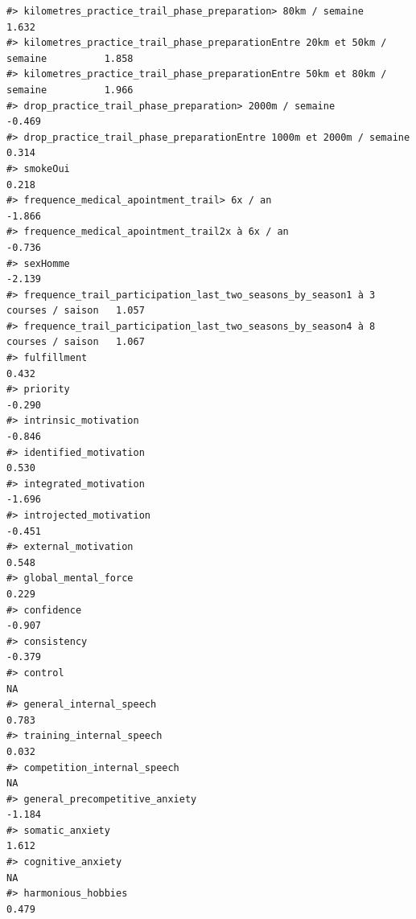 \documentclass[
]{article}
\begin{document}
\begin{verbatim}
#> kilometres_practice_trail_phase_preparation> 80km / semaine                      1.632
#> kilometres_practice_trail_phase_preparationEntre 20km et 50km / semaine          1.858
#> kilometres_practice_trail_phase_preparationEntre 50km et 80km / semaine          1.966
#> drop_practice_trail_phase_preparation> 2000m / semaine                          -0.469
#> drop_practice_trail_phase_preparationEntre 1000m et 2000m / semaine              0.314
#> smokeOui                                                                         0.218
#> frequence_medical_apointment_trail> 6x / an                                     -1.866
#> frequence_medical_apointment_trail2x à 6x / an                                  -0.736
#> sexHomme                                                                        -2.139
#> frequence_trail_participation_last_two_seasons_by_season1 à 3 courses / saison   1.057
#> frequence_trail_participation_last_two_seasons_by_season4 à 8 courses / saison   1.067
#> fulfillment                                                                      0.432
#> priority                                                                        -0.290
#> intrinsic_motivation                                                            -0.846
#> identified_motivation                                                            0.530
#> integrated_motivation                                                           -1.696
#> introjected_motivation                                                          -0.451
#> external_motivation                                                              0.548
#> global_mental_force                                                              0.229
#> confidence                                                                      -0.907
#> consistency                                                                     -0.379
#> control                                                                             NA
#> general_internal_speech                                                          0.783
#> training_internal_speech                                                         0.032
#> competition_internal_speech                                                         NA
#> general_precompetitive_anxiety                                                  -1.184
#> somatic_anxiety                                                                  1.612
#> cognitive_anxiety                                                                   NA
#> harmonious_hobbies                                                               0.479

\end{verbatim}
\end{document}
